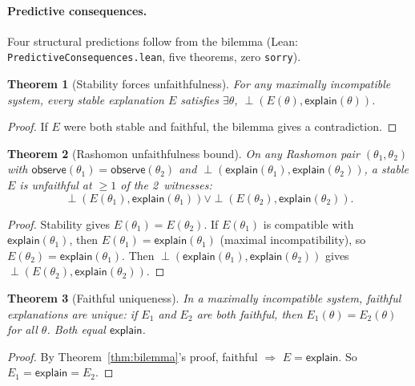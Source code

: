 \documentclass[11pt,a4paper]{article}
\newtheorem{theorem}{Theorem}[section]
\newcommand{\incomp}{\perp}
\begin{document}
\paragraph{Predictive consequences.}
Four structural predictions follow from the bilemma (Lean: \texttt{PredictiveConsequences.lean}, five theorems, zero \texttt{sorry}).

\begin{theorem}[Stability forces unfaithfulness]
\label{thm:stable-implies-unfaithful}
For any maximally incompatible system, every stable explanation $E$ satisfies $\exists \theta$, $\incomp(E(\theta), \mathsf{explain}(\theta))$.
\end{theorem}

\begin{proof}
If $E$ were both stable and faithful, the bilemma gives a contradiction.
\end{proof}

\begin{theorem}[Rashomon unfaithfulness bound]
\label{thm:rashomon-unfaithfulness}
On any Rashomon pair $(\theta_1, \theta_2)$ with $\mathsf{observe}(\theta_1) = \mathsf{observe}(\theta_2)$ and $\incomp(\mathsf{explain}(\theta_1), \mathsf{explain}(\theta_2))$, a stable $E$ is unfaithful at $\geq 1$ of the 2~witnesses:
\[
\incomp(E(\theta_1), \mathsf{explain}(\theta_1)) \lor \incomp(E(\theta_2), \mathsf{explain}(\theta_2)).
\]
\end{theorem}

\begin{proof}
Stability gives $E(\theta_1) = E(\theta_2)$.  If $E(\theta_1)$ is compatible with $\mathsf{explain}(\theta_1)$, then $E(\theta_1) = \mathsf{explain}(\theta_1)$ (maximal incompatibility), so $E(\theta_2) = \mathsf{explain}(\theta_1)$.  Then $\incomp(\mathsf{explain}(\theta_1), \mathsf{explain}(\theta_2))$ gives $\incomp(E(\theta_2), \mathsf{explain}(\theta_2))$.
\end{proof}

\begin{theorem}[Faithful uniqueness]
\label{thm:faithful-unique}
In a maximally incompatible system, faithful explanations are unique: if $E_1$ and $E_2$ are both faithful, then $E_1(\theta) = E_2(\theta)$ for all $\theta$.  Both equal $\mathsf{explain}$.
\end{theorem}

\begin{proof}
By Theorem~\ref{thm:bilemma}'s proof, faithful $\Rightarrow$ $E = \mathsf{explain}$.  So $E_1 = \mathsf{explain} = E_2$.
\end{proof}
\end{document}
